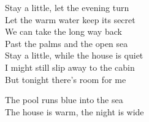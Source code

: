 \begin{lyrics}
Stay a little, let the evening turn\\
Let the warm water keep its secret\\
We can take the long way back\\
Past the palms and the open sea\\
Stay a little, while the house is quiet\\
I might still slip away to the cabin\\
But tonight there’s room for me

The pool runs blue into the sea\\
The house is warm, the night is wide
\end{lyrics}

